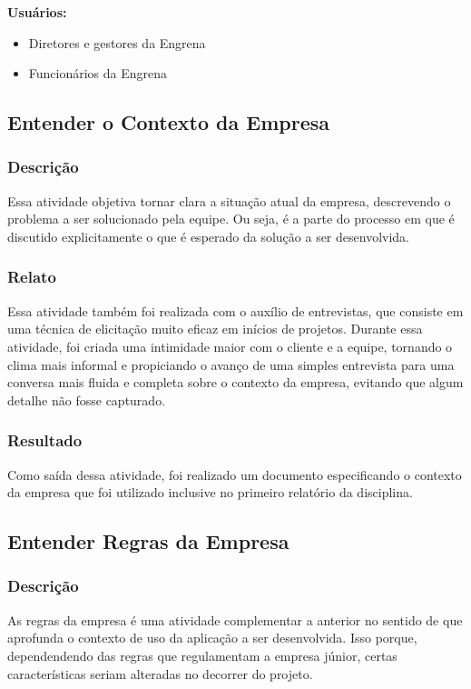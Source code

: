 \textbf{Usuários:}
\begin{itemize}
\item Diretores e gestores da Engrena
\item Funcionários da Engrena
\end{itemize}

\subsection{Entender o Contexto da Empresa}
\subsubsection{Descrição}
  Essa atividade objetiva tornar clara a situação atual da empresa, descrevendo o problema a ser solucionado pela equipe. Ou seja, é a parte do processo em que é discutido explicitamente o que é esperado da solução a ser desenvolvida.

\subsubsection{Relato}
  Essa atividade também foi realizada com o auxílio de entrevistas, que consiste em uma técnica de elicitação muito eficaz em inícios de projetos. Durante essa atividade, foi criada uma intimidade maior com o cliente e a equipe, tornando o clima mais informal e propiciando o avanço de uma simples entrevista para uma conversa mais fluida e completa sobre o contexto da empresa, evitando que algum detalhe não fosse capturado.

\subsubsection{Resultado}
  Como saída dessa atividade, foi realizado um documento especificando o contexto da empresa que foi utilizado inclusive no primeiro relatório da disciplina.

\subsection{Entender Regras da Empresa}
\subsubsection{Descrição}
  As regras da empresa é uma atividade complementar a anterior no sentido de que aprofunda o contexto de uso da aplicação a ser desenvolvida. Isso porque, dependendendo das regras que regulamentam a empresa júnior, certas características seriam alteradas no decorrer do projeto.


